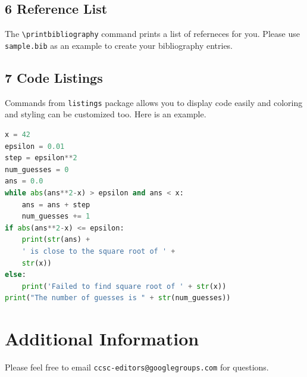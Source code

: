 \documentclass[10pt]{article}
\begin{document}
\subsection*{6 Reference List}
The \verb+\printbibliography+ command prints a list of referneces for you. Please use \texttt{sample.bib} as an example to create your bibliography entries.

\subsection*{7 Code Listings}
Commands from \texttt{listings} package allows you to display code easily and coloring and styling can be customized too. Here is an example.

\begin{lstlisting}[language=Python,  caption=Python example]
x = 42
epsilon = 0.01
step = epsilon**2
num_guesses = 0
ans = 0.0
while abs(ans**2-x) > epsilon and ans < x:
    ans = ans + step
    num_guesses += 1
if abs(ans**2-x) <= epsilon:
    print(str(ans) +
    ' is close to the square root of ' +
    str(x))
else:
    print('Failed to find square root of ' + str(x))
print("The number of guesses is " + str(num_guesses))
\end{lstlisting}

\section*{Additional Information}
Please feel free to email \verb+ccsc-editors@googlegroups.com+ for questions.

\medskip

\printbibliography
\end{document}
